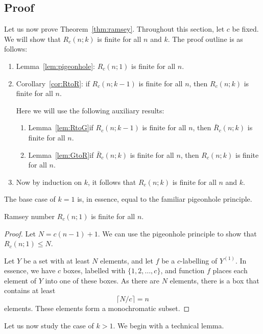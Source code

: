 \subsection{Proof}\label{ssec:ramsey-proof}

Let us now prove Theorem~\ref{thm:ramsey}. Throughout this section, let $c$ be fixed. We will show that $R_c(n;k)$ is finite for all $n$ and $k$. The proof outline is as follows:
\begin{enumerate}
    \item Lemma~\ref{lem:pigeonhole}: $R_c(n;1)$ is finite for all $n$.
    \item Corollary~\ref{cor:RtoR}: if $R_c(n;k-1)$ is finite for all $n$, then $R_c(n;k)$ is finite for all $n$.
    
        Here we will use the following auxiliary results:
        \begin{enumerate}[label=(\roman*)]
            \item Lemma~\ref{lem:RtoG}\mydash if $R_c(n;k-1)$ is finite for all $n$, then $\bar{R}_c(n;k)$ is finite for all $n$.
            \item Lemma~\ref{lem:GtoR}\mydash if $\bar{R}_c(n;k)$ is finite for all $n$, then $R_c(n;k)$ is finite for all $n$.
        \end{enumerate}
    \item Now by induction on $k$, it follows that $R_c(n;k)$ is finite for all $n$ and $k$.
\end{enumerate}

The base case of $k = 1$ is, in essence, equal to the familiar pigeonhole principle.

\begin{lemma}\label{lem:pigeonhole}
    Ramsey number $R_c(n;1)$ is finite for all $n$.
\end{lemma}
\begin{proof}
    Let $N = c(n-1)+1$. We can use the pigeonhole principle to show that $R_c(n;1) \le N$.
    
    Let $Y$ be a set with at least $N$ elements, and let $f$ be a $c$-labelling of $Y^{(1)}$.
    In essence, we have $c$ boxes, labelled with $\{1,2,\dotsc,c\}$, and function $f$ places each element of $Y$ into one of these boxes.
    As there are $N$ elements, there is a box that contains at least
    \[
        \lceil N/c \rceil = n
    \]
    elements. These elements form a monochromatic subset.
\end{proof}

Let us now study the case of $k > 1$. We begin with a technical lemma.

